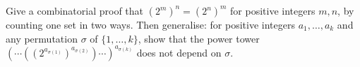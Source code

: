 Give a combinatorial proof that $(2^m)^n=(2^n)^m$ for positive integers $m,n$, by counting one set in two ways. Then generalise: for positive integers $a_1,\dots,a_k$ and any permutation $\sigma$ of $\{1,\dots,k\}$, show that the power tower $\left(\cdots\left(\left(2^{a_{\sigma(1)}}\right)^{a_{\sigma(2)}}\right)\cdots\right)^{a_{\sigma(k)}}$ does not depend on $\sigma$.
